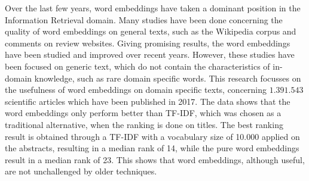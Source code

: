 \documentclass[../../Thesis.tex]{subfiles}
\begin{document}
Over the last few years, word embeddings have taken a dominant position in the Information Retrieval domain. Many studies have been done concerning the quality of word embeddings on general texts, such as the Wikipedia corpus and comments on review websites. Giving promising results, the word embeddings have been studied and improved over recent years. However, these studies have been focused on generic text, which do not contain the characteristics of in-domain knowledge, such as rare domain specific words. This research focusses on the usefulness of word embeddings on domain specific texts, concerning $1.391.543$ scientific articles which have been published in 2017. The data shows that the word embeddings only perform better than TF-IDF, which was chosen as a traditional alternative, when the ranking is done on titles. The best ranking result is obtained through a TF-IDF with a vocabulary size of 10.000 applied on the abstracts, resulting in a median rank of 14, while the pure word embeddings result in a median rank of 23. This shows that word embeddings, although useful, are not unchallenged by older techniques.
\end{document}
